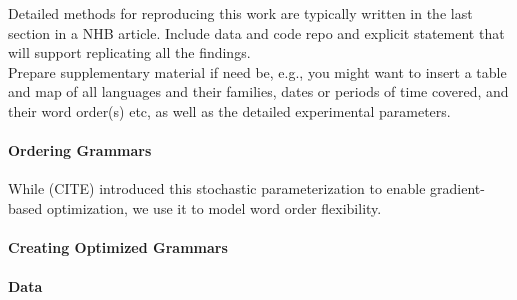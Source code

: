 \documentclass[11pt,a4paper]{article}
\begin{document}
{\color{blue}Detailed methods for reproducing this work are typically written in the last section in a NHB article. Include data and code repo and explicit statement that will support replicating all the findings.}\\

{\color{blue}Prepare supplementary material if need be, e.g., you might want to insert a table and map of all languages and their families, dates or periods of time covered, and their word order(s) etc, as well as the detailed experimental parameters.}


\paragraph{Ordering Grammars}





While (CITE) introduced this stochastic parameterization to enable gradient-based optimization, we use it to model word order flexibility.

\paragraph{Creating Optimized Grammars}


\paragraph{Data}
\end{document}
